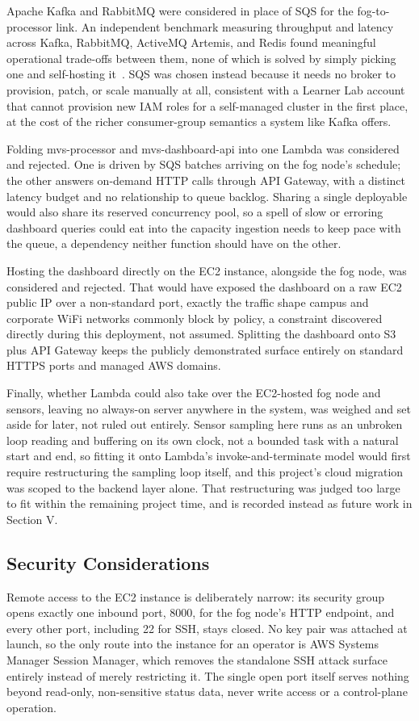 \documentclass[conference]{IEEEtran}
\begin{document}
Apache Kafka and RabbitMQ were considered in place of SQS for the fog-to-processor link. An independent benchmark measuring throughput and latency across Kafka, RabbitMQ, ActiveMQ Artemis, and Redis found meaningful operational trade-offs between them, none of which is solved by simply picking one and self-hosting it~\cite{ref5}. SQS was chosen instead because it needs no broker to provision, patch, or scale manually at all, consistent with a Learner Lab account that cannot provision new IAM roles for a self-managed cluster in the first place, at the cost of the richer consumer-group semantics a system like Kafka offers.

Folding mvs-processor and mvs-dashboard-api into one Lambda was considered and rejected. One is driven by SQS batches arriving on the fog node's schedule; the other answers on-demand HTTP calls through API Gateway, with a distinct latency budget and no relationship to queue backlog. Sharing a single deployable would also share its reserved concurrency pool, so a spell of slow or erroring dashboard queries could eat into the capacity ingestion needs to keep pace with the queue, a dependency neither function should have on the other.

Hosting the dashboard directly on the EC2 instance, alongside the fog node, was considered and rejected. That would have exposed the dashboard on a raw EC2 public IP over a non-standard port, exactly the traffic shape campus and corporate WiFi networks commonly block by policy, a constraint discovered directly during this deployment, not assumed. Splitting the dashboard onto S3 plus API Gateway keeps the publicly demonstrated surface entirely on standard HTTPS ports and managed AWS domains.

Finally, whether Lambda could also take over the EC2-hosted fog node and sensors, leaving no always-on server anywhere in the system, was weighed and set aside for later, not ruled out entirely. Sensor sampling here runs as an unbroken loop reading and buffering on its own clock, not a bounded task with a natural start and end, so fitting it onto Lambda's invoke-and-terminate model would first require restructuring the sampling loop itself, and this project's cloud migration was scoped to the backend layer alone. That restructuring was judged too large to fit within the remaining project time, and is recorded instead as future work in Section V.

\subsection{Security Considerations}
Remote access to the EC2 instance is deliberately narrow: its security group opens exactly one inbound port, 8000, for the fog node's HTTP endpoint, and every other port, including 22 for SSH, stays closed. No key pair was attached at launch, so the only route into the instance for an operator is AWS Systems Manager Session Manager, which removes the standalone SSH attack surface entirely instead of merely restricting it. The single open port itself serves nothing beyond read-only, non-sensitive status data, never write access or a control-plane operation.
\end{document}
